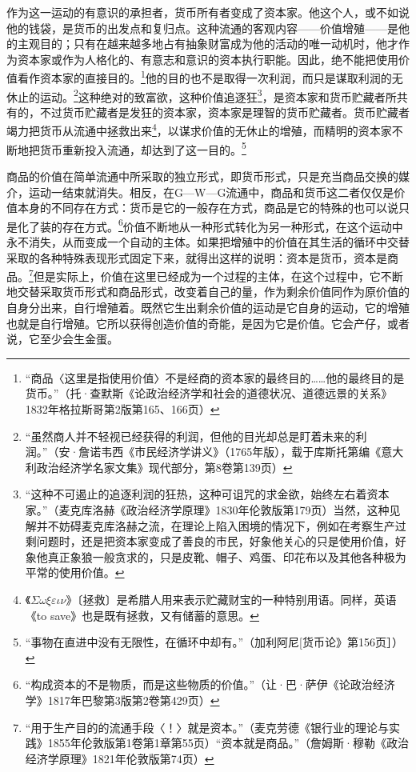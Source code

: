 \documentclass{ctexbook}
\begin{document}
    作为这一运动的有意识的承担者，货币所有者变成了资本家。他这个人，或不如说他的钱袋，是货币的出发点和复归点。这种流通的客观内容——价值增殖——是他的主观目的；只有在越来越多地占有抽象财富成为他的活动的唯一动机时，他才作为资本家或作为人格化的、有意志和意识的资本执行职能。因此，绝不能把使用价值看作资本家的直接目的。\footnote{“商品〈这里是指使用价值〉不是经商的资本家的最终目的……他的最终目的是货币。”（托·查默斯《论政治经济学和社会的道德状况、道德远景的关系》1832年格拉斯哥第2版第165、166页）}他的目的也不是取得一次利润，而只是谋取利润的无休止的运动。\footnote{“虽然商人并不轻视已经获得的利润，但他的目光却总是盯着未来的利润。”（安·詹诺韦西《市民经济学讲义》（1765年版），载于库斯托第编《意大利政治经济学名家文集》现代部分，第8卷第139页）}这种绝对的致富欲，这种价值追逐狂\footnote{“这种不可遏止的追逐利润的狂热，这种可诅咒的求金欲，始终左右着资本家。”（麦克库洛赫《政治经济学原理》1830年伦敦版第179页）当然，这种见解并不妨碍麦克库洛赫之流，在理论上陷入困境的情况下，例如在考察生产过剩问题时，还是把资本家变成了善良的市民，好象他关心的只是使用价值，好象他真正象狼一般贪求的，只是皮靴、帽子、鸡蛋、印花布以及其他各种极为平常的使用价值。}，是资本家和货币贮藏者所共有的，不过货币贮藏者是发狂的资本家，资本家是理智的货币贮藏者。货币贮藏者竭力把货币从流通中拯救出来\footnote{《$\Sigma $$\omega $$\xi $$\varepsilon $$\iota $$\nu $》〔拯救〕是希腊人用来表示贮藏财宝的一种特别用语。同样，英语《to save》也是既有拯救，又有储蓄的意思。}，以谋求价值的无休止的增殖，而精明的资本家不断地把货币重新投入流通，却达到了这一目的。\footnote{“事物在直进中没有无限性，在循环中却有。”（加利阿尼[货币论》第156页］）}

    商品的价值在简单流通中所采取的独立形式，即货币形式，只是充当商品交换的媒介，运动一结束就消失。相反，在G—W—G流通中，商品和货币这二者仅仅是价值本身的不同存在方式：货币是它的一般存在方式，商品是它的特殊的也可以说只是化了装的存在方式。\footnote{“构成资本的不是物质，而是这些物质的价值。”（让·巴·萨伊《论政治经济学》1817年巴黎第3版第2卷第429页）}价值不断地从一种形式转化为另一种形式，在这个运动中永不消失，从而变成一个自动的主体。如果把增殖中的价值在其生活的循环中交替采取的各种特殊表现形式固定下来，就得出这样的说明：资本是货币，资本是商品。\footnote{“用于生产目的的流通手段〈！〉就是资本。”（麦克劳德《银行业的理论与实践》1855年伦敦版第1卷第1章第55页）“资本就是商品。”（詹姆斯·穆勒《政治经济学原理》1821年伦敦版第74页）}但是实际上，价值在这里已经成为一个过程的主体，在这个过程中，它不断地交替采取货币形式和商品形式，改变着自己的量，作为剩余价值同作为原价值的自身分出来，自行增殖着。既然它生出剩余价值的运动是它自身的运动，它的增殖也就是自行增殖。它所以获得创造价值的奇能，是因为它是价值。它会产仔，或者说，它至少会生金蛋。
\end{document}
